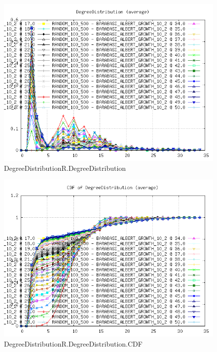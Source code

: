 \begin{figure} [h]
	\centering
	\includegraphics [scale=0.8] {plots/DegreeDistributionR.DegreeDistribution}
	\caption{DegreeDistributionR.DegreeDistribution}
	\label{plot:RANDOM_100_500 - BARABASI_ALBERT_GROWTH_10_2.DegreeDistributionR.DegreeDistribution}
\end{figure}

\begin{figure} [h]
	\centering
	\includegraphics [scale=0.8] {plots/DegreeDistributionR.DegreeDistribution.CDF}
	\caption{DegreeDistributionR.DegreeDistribution.CDF}
	\label{plot:RANDOM_100_500 - BARABASI_ALBERT_GROWTH_10_2.DegreeDistributionR.DegreeDistribution.CDF}
\end{figure}

